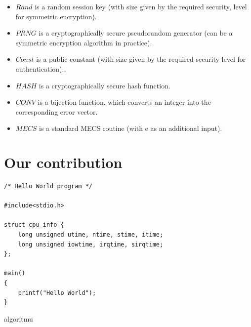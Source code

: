 \newpage
\label{kobara imai}
\begin{itemize}
	\item $Rand$ is a random session key (with size given by the required security,
	level for symmetric encryption).
	\item $PRNG$ is a cryptographically secure pseudorandom generator (can be
	a symmetric encryption algorithm in practice).
	\item $Const$ is a public constant (with size given by the required security level
	for authentication).,
	\item $HASH$ is a cryptographically secure hash function.
	\item $CONV$ is a bijection function, which converts an integer into the corresponding error vector.
	\item $MECS$ is a standard MECS routine (with e as an additional input).
\end{itemize}

\newpage


\section{Our contribution}


\begin{algorithm}
%
\begin{lstlisting}
/* Hello World program */

#include<stdio.h>

struct cpu_info {
    long unsigned utime, ntime, stime, itime;
    long unsigned iowtime, irqtime, sirqtime;
};

main()
{
    printf("Hello World");
}\end{lstlisting}
 \caption{algoritmu}
 \label{euclid}
\end{algorithm}